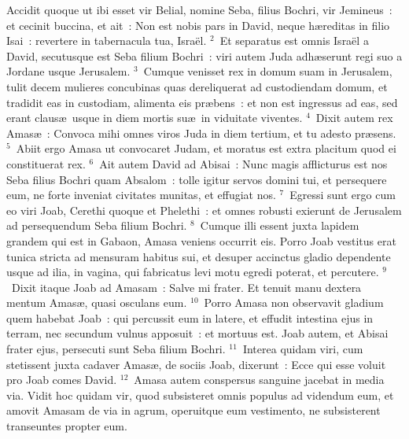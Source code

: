 \lettrine[lines=3,image=true,loversize=0.05,lraise=-0.03]{A}{}ccidit quoque ut ibi esset vir Belial, nomine Seba, filius Bochri, vir Jemineus~: et cecinit buccina, et ait~: Non est nobis pars in David, neque h\ae reditas in filio Isai~: revertere in tabernacula tua, Isra\"el.
${}^{2}$~Et separatus est omnis Isra\"el a David, secutusque est Seba filium Bochri~: viri autem Juda adh\ae serunt regi suo a Jordane usque Jerusalem.
${}^{3}$~Cumque venisset rex in domum suam in Jerusalem, tulit decem mulieres concubinas quas dereliquerat ad custodiendam domum, et tradidit eas in custodiam, alimenta eis pr\ae bens~: et non est ingressus ad eas, sed erant claus\ae\ usque in diem mortis su\ae\ in viduitate viventes.
${}^{4}$~Dixit autem rex Amas\ae~: Convoca mihi omnes viros Juda in diem tertium, et tu adesto pr\ae sens.
${}^{5}$~Abiit ergo Amasa ut convocaret Judam, et moratus est extra placitum quod ei constituerat rex.
${}^{6}$~Ait autem David ad Abisai~: Nunc magis afflicturus est nos Seba filius Bochri quam Absalom~: tolle igitur servos domini tui, et persequere eum, ne forte inveniat civitates munitas, et effugiat nos.
${}^{7}$~Egressi sunt ergo cum eo viri Joab, Cerethi quoque et Phelethi~: et omnes robusti exierunt de Jerusalem ad persequendum Seba filium Bochri.
${}^{8}$~Cumque illi essent juxta lapidem grandem qui est in Gabaon, Amasa veniens occurrit eis. Porro Joab vestitus erat tunica stricta ad mensuram habitus sui, et desuper accinctus gladio dependente usque ad ilia, in vagina, qui fabricatus levi motu egredi poterat, et percutere.
${}^{9}$~Dixit itaque Joab ad Amasam~: Salve mi frater. Et tenuit manu dextera mentum Amas\ae , quasi osculans eum.
${}^{10}$~Porro Amasa non observavit gladium quem habebat Joab~: qui percussit eum in latere, et effudit intestina ejus in terram, nec secundum vulnus apposuit~: et mortuus est. Joab autem, et Abisai frater ejus, persecuti sunt Seba filium Bochri.
${}^{11}$~Interea quidam viri, cum stetissent juxta cadaver Amas\ae , de sociis Joab, dixerunt~: Ecce qui esse voluit pro Joab comes David.
${}^{12}$~Amasa autem conspersus sanguine jacebat in media via. Vidit hoc quidam vir, quod subsisteret omnis populus ad videndum eum, et amovit Amasam de via in agrum, operuitque eum vestimento, ne subsisterent transeuntes propter eum.


